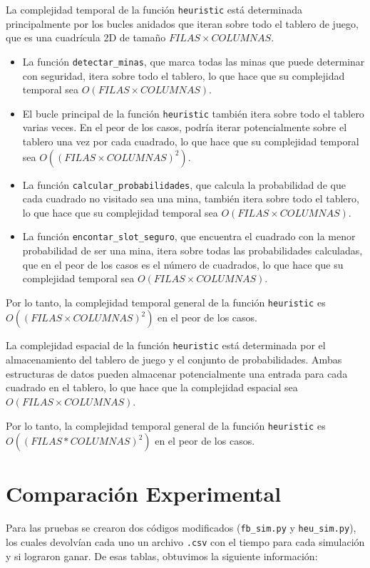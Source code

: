 \documentclass{article}
\begin{document}
La complejidad temporal de la función \texttt{heuristic} está determinada principalmente por los bucles anidados que iteran sobre todo el tablero de juego, que es una cuadrícula 2D de tamaño $FILAS \times COLUMNAS$.

\begin{itemize}
    \item La función \texttt{detectar\_minas}, que marca todas las minas que puede determinar con seguridad, itera sobre todo el tablero, lo que hace que su complejidad temporal sea $O(FILAS \times COLUMNAS)$.
    \item El bucle principal de la función \texttt{heuristic} también itera sobre todo el tablero varias veces. En el peor de los casos, podría iterar potencialmente sobre el tablero una vez por cada cuadrado, lo que hace que su complejidad temporal sea $O((FILAS \times COLUMNAS)^2)$.
    \item La función \texttt{calcular\_probabilidades}, que calcula la probabilidad de que cada cuadrado no visitado sea una mina, también itera sobre todo el tablero, lo que hace que su complejidad temporal sea $O(FILAS \times COLUMNAS)$.
    \item La función \texttt{encontar\_slot\_seguro}, que encuentra el cuadrado con la menor probabilidad de ser una mina, itera sobre todas las probabilidades calculadas, que en el peor de los casos es el número de cuadrados, lo que hace que su complejidad temporal sea $O(FILAS \times COLUMNAS)$.
\end{itemize}

Por lo tanto, la complejidad temporal general de la función \texttt{heuristic} es $O((FILAS \times COLUMNAS)^2)$ en el peor de los casos.

La complejidad espacial de la función \texttt{heuristic} está determinada por el almacenamiento del tablero de juego y el conjunto de probabilidades. Ambas estructuras de datos pueden almacenar potencialmente una entrada para cada cuadrado en el tablero, lo que hace que la complejidad espacial sea $O(FILAS \times COLUMNAS)$.

Por lo tanto, la complejidad temporal general de la función \texttt{heuristic} es $O((FILAS * COLUMNAS)^2)$ en el peor de los casos.

\section{Comparación Experimental}

Para las pruebas se crearon dos códigos modificados (\texttt{fb\_sim.py} y \texttt{heu\_sim.py}), los cuales devolvían cada uno un archivo \texttt{.csv} con el tiempo para cada simulación y si lograron ganar. De esas tablas, obtuvimos la siguiente información:
\end{document}
